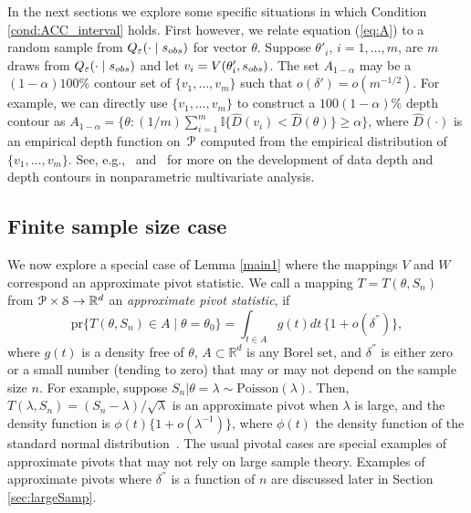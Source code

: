 	
In the next sections we explore some specific situations in which Condition \ref{cond:ACC_interval} holds. First however, we relate equation (\ref{eq:A}) to a random sample from $Q_{\veps}(\cdot \mid s_{\rm obs})$ for vector $\theta$. Suppose $\theta'_{i}$, $i = 1, \ldots, m$, are $m$  draws from $Q_{\veps}(\cdot \mid s_{\rm obs})$ and let ${v}_i =  V(\theta'_{i},  s_{\rm obs})$. The set $A_{1 - \alpha}$ may be a $(1-\alpha)100\%$ contour set of $\{{ v}_1, \ldots, { v}_m\}$ such that $o(\delta') = o(m^{-1/2})$. For example, we can directly use $\{ v_1, \ldots, v_m\}$ to construct a  $100(1-\alpha)\%$ depth contour as $A_{1 - \alpha} = \{\theta : (1/m)\sum_{i=1}^{m}\mathbb{I}{\{\hat D({ v}_i)< \hat D(\theta)\}} \geq \alpha\}$, where $\hat D(\cdot)$ is an empirical depth function on~$\P$ computed from the empirical distribution of $\{{ v}_1, \ldots, { v}_m\}$. See, e.g.,~\cite{Serfling2002} and~\cite{Liu1999} for more on the development of data depth and depth contours in nonparametric multivariate analysis.  
	
\subsection{Finite sample size case} 
We now explore a special case of Lemma \ref{main1} where the mappings $V$ and $W$ correspond an approximate pivot statistic. We call  a mapping $T = T(\theta, S_{n})$ from $\P \times {\cal S} \to \mathbb{R}^{d}$  an {\it approximate pivot statistic}, if
	\begin{equation}\label{eq:apivot}
	\text{pr}\{T(\theta, S_{n}) \in A \mid \theta = \theta_0\} =  \int_{t \in A}
	g(t) d t \,  \{1 + o(\delta^{''})\}, 
	\end{equation}
where $g(t)$ is a density free of $\theta$, $A \subset \mathbb{R}^{d}$ is any Borel set, and $\delta^{''}$ is either zero or a small number (tending to zero) that may or may not depend on the sample size $n$. For example, suppose $S_n | \theta = \lambda \sim \text{Poisson}(\lambda)$. Then, $T( \lambda, S_{n}) = (S_n -  \lambda)/\sqrt{ \lambda}$ is an approximate pivot when $\lambda$ is large, and the density function is $\phi(t) \{1 + o(\lambda^{-1})\}$, where $\phi(t)$ the density function of the standard normal distribution~\cite[]{Cheng1949}. The usual pivotal cases are special examples of approximate pivots that may not rely on large sample theory. Examples of approximate pivots where $\delta^{''}$ is a function of $n$
are discussed later in Section \ref{sec:largeSamp}. 

